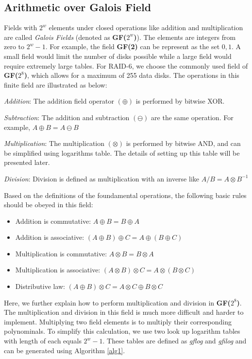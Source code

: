 \documentclass[journal]{IEEEtran}
\begin{document}
\subsection{Arithmetic over Galois Field}
Fields with $2^w$ elements under closed operations like addition and multiplication are called \emph{Galois Fields} (denoted as \textbf{GF($2^w$)}). The elements are integers from zero to $2^w-1$. For example, the field \textbf{GF(2)} can be represent as the set ${0,1}$. A small field would limit the number of disks possible while a large field would require extremely large tables. For RAID-6, we choose the commonly used field of \textbf{GF($2^8$)}, which allows for a maximum of 255 data disks. The operations in this finite field are illustrated as below:

\emph{Addition}: The addition field operator $(\oplus)$ is  performed by bitwise XOR. 

\emph{Subtraction}: The addition and subtraction $(\ominus)$ are the same operation. For example, $A \oplus B = A \ominus B$

\emph{Multiplication}: The multiplication $(\otimes)$ is performed by bitwise AND, and can be simplified using logarithms table. The details of setting up this table will be presented later.

\emph{Division}: Division is defined as multiplication with an inverse like $A/B = A \otimes B^{-1}$

Based on the definitions of the foundamental operations, the following basic rules should be obeyed in this field:

\begin{itemize}
	\item Addition is commutative: $A \oplus B = B \oplus A$
	\item Addition is associative:    $(A \oplus B) \oplus C = A \oplus (B \oplus C) $
	\item Multiplication is commutative: $A \otimes B = B \otimes A$
	\item Multiplication is associative: $(A \otimes B) \otimes C = A \otimes (B \otimes C)$
	\item  Distributive law: $(A \oplus B) \otimes C = A \otimes C  \oplus B \otimes C$
\end{itemize}

Here, we further explain how to perform multiplication and division in \textbf{GF($2^8$)}. The multiplication and division in this field is much more difficult and harder to implement. Multiplying two field elements is to multiply their corresponding polynominals. To simplify this calculation, we use two look up logarithm tables with length of each equals $2^w-1$. These tables are defined as \emph{gflog} and \emph{gfilog} and can be generated using Algorithm \ref{alg1}.
\end{document}
